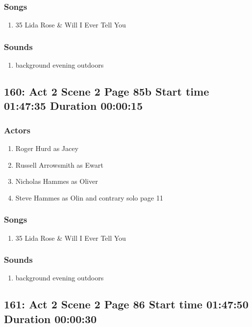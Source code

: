 \subsubsection{Songs}
\begin{enumerate}
\item 35 Lida Rose \& Will I Ever Tell You
\end{enumerate}\subsubsection{Sounds}
\begin{enumerate}
\item background evening outdoors
\end{enumerate}
\subsection{160: Act 2 Scene 2 Page 85b Start time 01:47:35 Duration 00:00:15}

\subsubsection{Actors}
\begin{enumerate}
\item Roger Hurd as Jacey
\item Russell Arrowsmith as Ewart
\item Nicholas Hammes as Oliver
\item Steve Hammes as Olin and contrary solo page 11
\end{enumerate}

\subsubsection{Songs}
\begin{enumerate}
\item 35 Lida Rose \& Will I Ever Tell You
\end{enumerate}\subsubsection{Sounds}
\begin{enumerate}
\item background evening outdoors
\end{enumerate}
\subsection{161: Act 2 Scene 2 Page 86 Start time 01:47:50 Duration 00:00:30}

